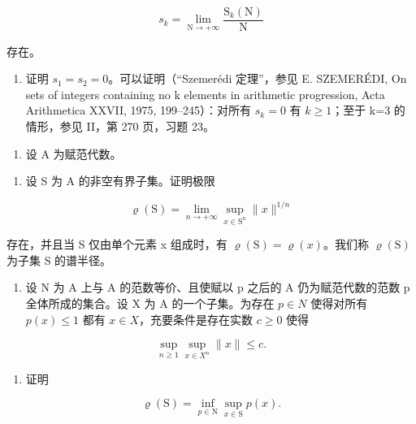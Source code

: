 \[
s _ {k} = \lim _ {\mathrm{N} \to + \infty} \frac {\mathrm{S} _ {k} (\mathrm{N})}{\mathrm{N}}
\]

存在。

\begin{enumerate}
\def\labelenumi{\alph{enumi})}
\setcounter{enumi}{1}
\tightlist
\item
  证明 \(s_{1}=s_{2}=0\)。可以证明（“Szemerédi 定理”，参见 E. SZEMERÉDI, On sets of integers containing no k elements in arithmetic progression, Acta Arithmetica XXVII, 1975, 199--245）：对所有 \(s_{k}=0\) 有 \(k\geqslant1\)；至于 k=3 的情形，参见 II，第 270 页，习题 23。
\end{enumerate}

\begin{enumerate}
\def\labelenumi{\arabic{enumi})}
\setcounter{enumi}{6}
\tightlist
\item
  设 A 为赋范代数。
\end{enumerate}

\begin{enumerate}
\def\labelenumi{\alph{enumi})}
\tightlist
\item
  设 S 为 A 的非空有界子集。证明极限
\end{enumerate}

\[
\varrho (\mathrm{S}) = \lim _ {n \to + \infty} \sup _ {x \in \mathrm{S} ^ {n}} \| x \| ^ {1 / n}
\]

存在，并且当 S 仅由单个元素 x 组成时，有 \(\varrho(\mathrm{S}) = \varrho(x)\)。我们称 \(\varrho(\mathrm{S})\) 为子集 S 的谱半径。

\begin{enumerate}
\def\labelenumi{\alph{enumi})}
\setcounter{enumi}{1}
\tightlist
\item
  设 N 为 A 上与 A 的范数等价、且使赋以 p 之后的 A 仍为赋范代数的范数 p 全体所成的集合。设 X 为 A 的一个子集。为存在 \(p \in N\) 使得对所有 \(p(x) \leqslant 1\) 都有 \(x \in X\)，充要条件是存在实数 \(c \geqslant 0\) 使得
\end{enumerate}

\[
\sup _ {n \geqslant 1} \sup _ {x \in X ^ {n}} \| x \| \leqslant c.
\]

\begin{enumerate}
\def\labelenumi{\alph{enumi})}
\setcounter{enumi}{2}
\tightlist
\item
  证明
\end{enumerate}

\[
\varrho (\mathrm{S}) = \inf _ {p \in \mathrm{N}} \sup _ {x \in \mathrm{S}} p (x).
\]

